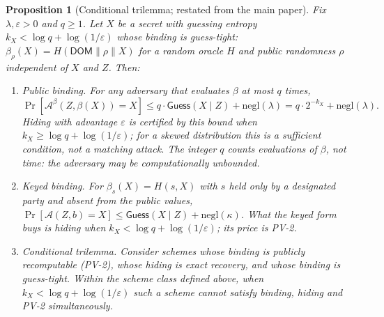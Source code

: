 \documentclass[10pt,journal,compsoc]{IEEEtran}
\newtheorem{proposition}[theorem]{Proposition}
\begin{document}
\begin{proposition}[Conditional trilemma; restated from the main paper]
\label{thm:t1}
Fix $\lambda,\varepsilon>0$ and $q\ge 1$. Let $X$ be a secret with guessing
entropy $k_X<\log q+\log(1/\varepsilon)$ whose binding is \emph{guess-tight}:
$\beta_\rho(X)=H(\mathsf{DOM}\|\rho\|X)$ for a random oracle $H$ and public
randomness $\rho$ independent of $X$ and $Z$. Then:
\begin{enumerate}
\item[(1)] \emph{Public binding.} For any adversary that evaluates $\beta$ at
most $q$ times,
\[
\Pr\!\left[\mathcal{A}^\beta(Z,\beta(X))=X\right]
\le q\cdot\mathsf{Guess}(X\mid Z)+\mathrm{negl}(\lambda)
= q\cdot 2^{-k_X}+\mathrm{negl}(\lambda).
\]
Hiding with advantage $\varepsilon$ is \emph{certified} by this bound when
$k_X\ge\log q+\log(1/\varepsilon)$; for a skewed distribution this is a
sufficient condition, not a matching attack. The integer $q$ counts evaluations
of $\beta$, not time: the adversary may be computationally unbounded.
\item[(2)] \emph{Keyed binding.} For $\beta_s(X)=H(s,X)$ with $s$ held only by a
designated party and absent from the public values,
$\Pr[\mathcal{A}(Z,b)=X]\le\mathsf{Guess}(X\mid Z)+\mathrm{negl}(\kappa)$.
What the keyed form buys is hiding when
$k_X<\log q+\log(1/\varepsilon)$; its price is PV-2.
\item[(3)] \emph{Conditional trilemma.} Consider schemes whose binding is
publicly recomputable (PV-2), whose hiding is exact recovery, and whose binding
is guess-tight. Within the scheme class defined above, when
$k_X<\log q+\log(1/\varepsilon)$ such a scheme cannot satisfy binding, hiding
and PV-2 simultaneously.
\end{enumerate}
\end{proposition}
\end{document}
